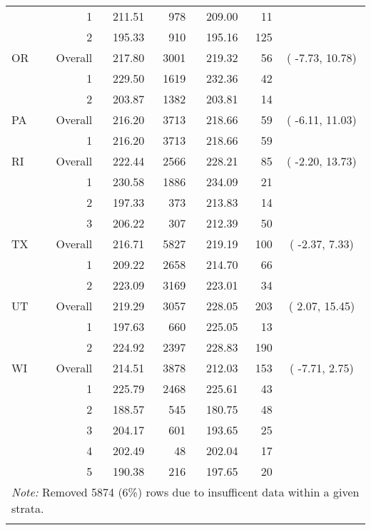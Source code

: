 \begin{longtable}{lrrr@{\extracolsep{.25cm}}rrc}
   & 1 & 211.51 & 978 & 209.00 &  11 &  \\ 
   & 2 & 195.33 & 910 & 195.16 & 125 &  \\ 
   \hline
OR & Overall & 217.80 & 3001 & 219.32 &  56 & ( -7.73,  10.78) \\ 
   & 1 & 229.50 & 1619 & 232.36 &  42 &  \\ 
   & 2 & 203.87 & 1382 & 203.81 &  14 &  \\ 
   \hline
PA & Overall & 216.20 & 3713 & 218.66 &  59 & ( -6.11,  11.03) \\ 
   & 1 & 216.20 & 3713 & 218.66 &  59 &  \\ 
   \hline
RI & Overall & 222.44 & 2566 & 228.21 &  85 & ( -2.20,  13.73) \\ 
   & 1 & 230.58 & 1886 & 234.09 &  21 &  \\ 
   & 2 & 197.33 & 373 & 213.83 &  14 &  \\ 
   & 3 & 206.22 & 307 & 212.39 &  50 &  \\ 
   \hline
TX & Overall & 216.71 & 5827 & 219.19 & 100 & ( -2.37,   7.33) \\ 
   & 1 & 209.22 & 2658 & 214.70 &  66 &  \\ 
   & 2 & 223.09 & 3169 & 223.01 &  34 &  \\ 
   \hline
UT & Overall & 219.29 & 3057 & 228.05 & 203 & (  2.07,  15.45) \\ 
   & 1 & 197.63 & 660 & 225.05 &  13 &  \\ 
   & 2 & 224.92 & 2397 & 228.83 & 190 &  \\ 
   \hline
WI & Overall & 214.51 & 3878 & 212.03 & 153 & ( -7.71,   2.75) \\ 
   & 1 & 225.79 & 2468 & 225.61 &  43 &  \\ 
   & 2 & 188.57 & 545 & 180.75 &  48 &  \\ 
   & 3 & 204.17 & 601 & 193.65 &  25 &  \\ 
   & 4 & 202.49 &  48 & 202.04 &  17 &  \\ 
   & 5 & 190.38 & 216 & 197.65 &  20 &  \\ 
   \hline \multicolumn{7}{l}{\textit{Note:} Removed 5874 (6\%) rows due to insufficent data within a given strata.} \\\hline
\label{g4read-mlpsa-ctree}
\end{longtable}
